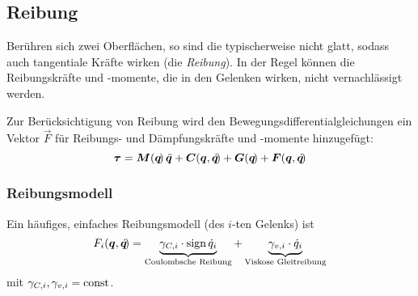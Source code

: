 		\subsection{Reibung}
			Berühren sich zwei Oberflächen, so sind die typischerweise nicht glatt, sodass auch tangentiale Kräfte wirken (die \emph{Reibung}). In der Regel können die Reibungskräfte und -momente, die in den Gelenken wirken, nicht vernachlässigt werden.

			Zur Berücksichtigung von Reibung wird den Bewegungsdifferentialgleichungen \INVDYN ein Vektor \( \vec{F} \) für Reibungs- und Dämpfungskräfte und -momente hinzugefügt:
			\begin{equation*}
				\bm{\tau} = \bm{M}(\bm{q}\!)\, \ddot{\bm{q}} + \bm{C}(\bm{q}, \dot{\bm{q}}\!) + \bm{G}(\bm{q}\!) + \bm{F}(\bm{q}, \dot{\bm{q}}\!)
			\end{equation*}

			\subsubsection{Reibungsmodell}
				Ein häufiges, einfaches Reibungsmodell (des \(i\)-ten Gelenks) ist
				\begin{equation*}
					F_i(\bm{q}, \dot{\bm{q}}\!) = \underbrace{\gamma_{C, i} \cdot \operatorname{sign} \dot{q}_i}_\text{Coulombsche Reibung} + \underbrace{\gamma_{v, i} \cdot \dot{q}_i}_\text{Viskose Gleitreibung}
				\end{equation*}
				mit \( \gamma_{C, i}, \gamma_{v, i} = \operatorname{const} \).

